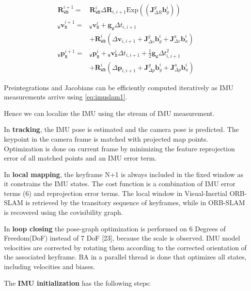 \begin{align} \label{eq:imuslam1} \mathbf {R}^{i+1}_\mathtt {WB} = & \mathbf {R}^{i}_\mathtt {WB} \Delta \mathbf {R}_{i,i+1} \text{Exp}\left(\left(\mathbf {J}^g_{\Delta R}\mathbf {b}^i_g\right)\right) \nonumber\\ _\mathtt {W}\mathbf {v}^{i+1}_\mathtt {B} = & {_\mathtt {W}\mathbf {v}^{i}_\mathtt {B}} + \mathbf {g}_\mathtt {W} \Delta t_{i,i+1} \nonumber\\ &+ \mathbf {R}^{i}_\mathtt {WB} \left(\Delta \mathbf {v}_{i,i+1} + \mathbf {J}^g_{\Delta v} \mathbf {b}^i_g + \mathbf {J}^a_{\Delta v} \mathbf {b}^i_a\right) \nonumber\\ _\mathtt {W}\mathbf {p}^{i+1}_\mathtt {B} = & {_\mathtt {W}\mathbf {p}^{i}_\mathtt {B}} + {_\mathtt {W}\mathbf {v}^{i}_\mathtt {B}} \Delta t_{i,i+1} + \frac{1}{2}\mathbf {g}_\mathtt {W} \Delta t^2_{i,i+1} \nonumber\\ & + \mathbf {R}^{i}_\mathtt {WB} \left(\Delta \mathbf {p}_{i,i+1} + \mathbf {J}^g_{\Delta p} \mathbf {b}^i_g + \mathbf {J}^a_{\Delta p} \mathbf {b}^i_a\right) \end{align}

Preintegrations and Jacobians can be efficiently computed iteratively as IMU measurements arrive using \ref{eq:imuslam1}.

Hence we can localize the IMU using the stream of IMU measurement.

In \textbf{tracking}, the IMU pose is estimated and the camera pose is predicted. The keypoint in the camera frame is matched with projected map points. Optimization is done on current frame by minimizing the feature reprojection error of all matched points and an IMU error term. 

In \textbf{local mapping}, the keyframe N+1 is always included in the fixed window as it constrains the IMU states. The cost function is a combination of IMU error terms (6) and reprojection error terms. The local window in Visual-Inertial ORB-SLAM is retrieved by the transitory sequence of keyframes, while in ORB-SLAM is recovered using the covisibility graph.

In \textbf{loop closing} the pose-graph optimization is performed on 6 Degrees of Freedom(DoF) instead of 7 DoF [23], because the scale is observed.  IMU model velocities are corrected by rotating them according to the corrected orientation of the associated keyframe.  BA in a parallel thread is done that optimizes all states, including velocities and biases. 

The \textbf{IMU initialization} has the following steps:


